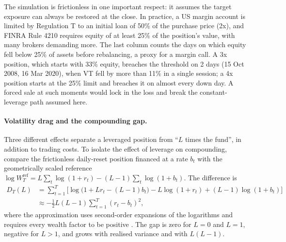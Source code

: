\documentclass[11pt,a4paper]{article}
\begin{document}
The simulation is frictionless in one important respect: it assumes the target exposure can always be restored at the close. In practice, a US margin account is limited by Regulation T to an initial loan of 50\% of the purchase price (2x), and FINRA Rule 4210 requires equity of at least 25\% of the position's value, with many brokers demanding more. The last column counts the days on which equity fell below 25\% of assets before rebalancing, a proxy for a margin call. A 3x position, which starts with 33\% equity, breaches the threshold on 2 days (15 Oct 2008, 16 Mar 2020), when VT fell by more than 11\% in a single session; a 4x position starts at the 25\% limit and breaches it on almost every down day. A forced sale at such moments would lock in the loss and break the constant-leverage path assumed here.

\paragraph{Volatility drag and the compounding gap.} Three different effects separate a leveraged position from ``$L$ times the fund'', in addition to trading costs. To isolate the effect of leverage on compounding, compare the frictionless daily-reset position financed at a rate $b_t$ with the geometrically scaled reference $\log W^{\text{ref}}_T = L\sum_t \log(1+r_t) - (L-1)\sum_t\log(1+b_t)$. The difference is
\begin{align*}
D_T(L) &= \sum_{t=1}^{T}\Big[\log\big(1 + L r_t - (L-1) b_t\big) - L\log(1+r_t) + (L-1)\log(1+b_t)\Big] \\
&\approx -\tfrac12 L(L-1)\sum_{t=1}^{T}(r_t - b_t)^2 ,
\end{align*}
where the approximation uses second-order expansions of the logarithms and requires every wealth factor to be positive \citep{cheng2009,avellaneda2010}. The gap is zero for $L=0$ and $L=1$, negative for $L>1$, and grows with realised variance and with $L(L-1)$.
\end{document}
